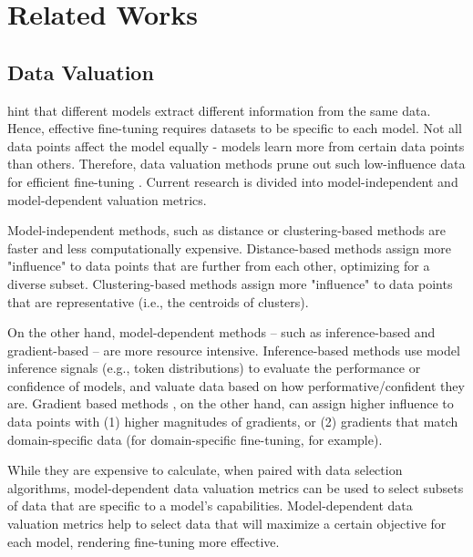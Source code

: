 \section{Related Works}
\label{sec: related works}
\subsection{Data Valuation}
\label{sec: data valuation}
\citet{wei2023largerlanguagemodelsincontext} hint that different models extract different information from the same data. Hence, effective fine-tuning requires datasets to be specific to each model. Not all data points affect the model equally - models learn more from certain data points than others. Therefore, data valuation methods prune out such low-influence data for efficient fine-tuning \citep{less, delift}. Current research is divided into model-independent and model-dependent valuation metrics. 

Model-independent methods, such as distance or clustering-based methods \citep{deftucs, tsds, smart} are faster and less computationally expensive. Distance-based methods assign more "influence" to data points that are further from each other, optimizing for a diverse subset. Clustering-based methods assign more "influence" to data points that are representative (i.e., the centroids of clusters). 

On the other hand, model-dependent methods -- such as inference-based and gradient-based -- are more resource intensive. Inference-based methods \citep{selectit, delift} use model inference signals (e.g., token distributions) to evaluate the performance or confidence of models, and valuate data based on how performative/confident they are. Gradient based methods \citep{less, craig, gradmatch, kohliang}, on the other hand, can assign higher influence to data points with (1) higher magnitudes of gradients, or (2) gradients that match domain-specific data (for domain-specific fine-tuning, for example).

While they are expensive to calculate, when paired with data selection algorithms, model-dependent data valuation metrics can be used to select subsets of data that are specific to a model's capabilities. Model-dependent data valuation metrics help to select data that will maximize a certain objective for each model, rendering fine-tuning more effective. %


